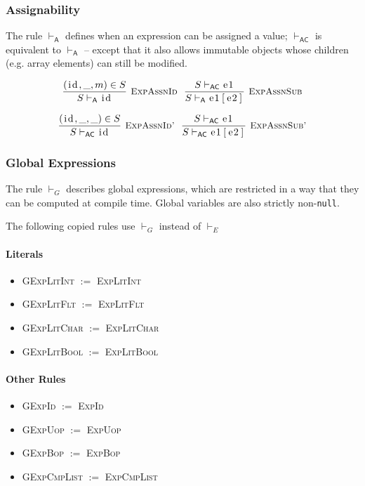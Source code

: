 \documentclass{article}
\newcommand{\code}[1]{\lstinline[columns=fixed]{#1}}
\newcommand{\drmrule}[5]{\frac{#1}{#2\vdash_{\mathsf{#3}}#4}\textsc{\ \small{#5}}}
\newcommand{\ruleapp}[1]{\vdash_{\mathsf{#1}}}
\newcommand{\mc}[1]{\textnormal{\code{#1}}}
\newcommand{\subsubsubsection}{\paragraph}
\begin{document}
			\subsubsection{Assignability}
			
				The rule $\ruleapp{A}$ defines when an expression can be assigned a value; $\ruleapp{AC}$ is equivalent to $\ruleapp{A}$ -- except that it also allows immutable objects whose children (e.g. array elements) can still be modified.
				
				\begin{align*}
					\drmrule{(\mc{id},\_,m)\in S}{S}{A}{\mc{id}}{ExpAssnId}\ \ 
					\drmrule{S\ruleapp{AC}\mc{e1}}{S}{A}{\mc{e1[e2]}}{ExpAssnSub}
				\end{align*}
				
				\begin{align*}
					\drmrule{(\mc{id},\_,\_)\in S}{S}{AC}{\mc{id}}{ExpAssnId'}\ \ 
					\drmrule{S\ruleapp{AC}\mc{e1}}{S}{AC}{\mc{e1[e2]}}{ExpAssnSub'}
				\end{align*}
				
			\subsubsection{Global Expressions}
			
				The rule $\vdash_G$ describes global expressions, which are restricted in a way that they can be computed at compile time. Global variables are also strictly non-\code{null}.
				
				The following copied rules use $\vdash_G$ instead of $\vdash_E$
				
				\subsubsubsection{Literals}
				
					\begin{itemize}
						\item \textsc{GExpLitInt} $:=$ \textsc{ExpLitInt}
						\item \textsc{GExpLitFlt} $:=$ \textsc{ExpLitFlt}
						\item \textsc{GExpLitChar} $:=$ \textsc{ExpLitChar}
						\item \textsc{GExpLitBool} $:=$ \textsc{ExpLitBool}
					\end{itemize}
				
				\subsubsubsection{Other Rules}
				
					\begin{itemize}
						\item \textsc{GExpId} $:=$ \textsc{ExpId}
						\item \textsc{GExpUop} $:=$ \textsc{ExpUop}
						\item \textsc{GExpBop} $:=$ \textsc{ExpBop}
						\item \textsc{GExpCmpList} $:=$ \textsc{ExpCmpList}
					\end{itemize}
				
\end{document}
